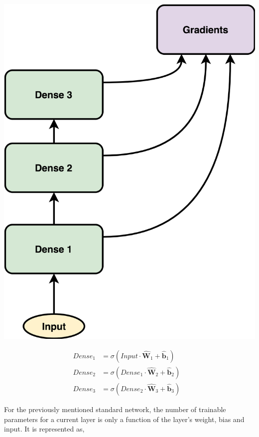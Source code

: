 \usepackage{}\documentclass{article}
\let\oldhat\hat
\renewcommand{\hat}[1]{\oldhat{\mathbf{#1}}}
\begin{document}
\noindent\begin{minipage}{.45\textwidth}
   \centering
   \includegraphics[scale=0.09]{SimpleFFN.png}
   \label{fig:SimpleFFN.png}
\end{minipage}
\begin{minipage}{.45\textwidth}
\begin{equation}
\label{eq:ffn_math_representation}
\begin{aligned}
   Dense_{1} &= \sigma(Input \cdot \hat{W}_{1} + \hat{b}_{1}) &\\
   Dense_{2} &= \sigma(Dense_{1} \cdot \hat{W}_{2} + \hat{b}_{2}) &\\
   Dense_{3} &= \sigma(Dense_{2} \cdot \hat{W}_{3} + \hat{b}_{3}) 
\end{aligned}
\end{equation}
\end{minipage}

For the previously mentioned standard network, the number of trainable parameters for a current layer is only a function of the layer's weight, bias and input. It is represented as, 
\end{document}
